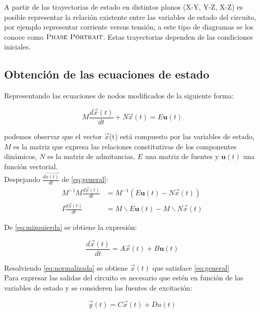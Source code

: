 \documentclass[10pt,a4paper]{article} %
\begin{document}
	A partir de las trayectorias de estado en distintos planos (X-Y, Y-Z, X-Z) es posible representar la relación existente entre las variables de estado del circuito, por ejemplo representar corriente versus tensión, a este tipo de diagramas se los conoce como $\textsc{Phase Portrait}$. Estas trayectorias dependen de las condiciones iniciales.	
	
	\subsection{Obtención de las ecuaciones de estado}
	
	Representando las ecuaciones de nodos modificados de la siguiente forma:
	
	\begin{equation}
		M\frac{d\vec{x}(t)}{dt}+N\vec{x}(t)=E\textbf{u}(t)\label{eq:general}
	\end{equation}
	
	podemos observar que el vector $\vec{x}$(t) está compuesto por las variables de estado, $M$ es la matriz que expresa las relaciones constitutivas de los componentes dinámicos, $N$ es la matriz de admitancias, $E$ una matriz de fuentes y $\textbf{u}(t)$ una función vectorial.\\
	
	Despejando $\frac{d\vec{x(t)}}{dt}$ de \ref{eq:general}:
	\begin{align}
		M^{-1}M\frac{d\vec{x}(t)}{dt}&=M^{-1}\left(E\textbf{u}(t)-N\vec{x}(t)\right)\nonumber\\
		I\frac{d\vec{x}(t)}{dt}&=M\backslash E\textbf{u}(t)- M\backslash N\vec{x}(t)\label{eq:mizquierda}
	\end{align}
	
	De \ref{eq:mizquierda} se obtiene la expresión:
	
	\begin{equation}
		\frac{d\vec{x}(t)}{dt}=A\vec{x}(t)+B\textbf{u}(t) \label{eq:normalizada}
	\end{equation}
	
	Resolviendo \ref{eq:normalizada} se obtiene $\vec{x}(t)$ que satisface \ref{eq:general}\\
	
	Para expresar las salidas del circuito es necesario que estén en función de las variables de estado y se consideren las fuentes de excitación:
	
		\begin{equation}
	\vec{y}(t)=C\vec{x}(t)+Du(t)\label{eq:salida}
	\end{equation}
	
\end{document}
